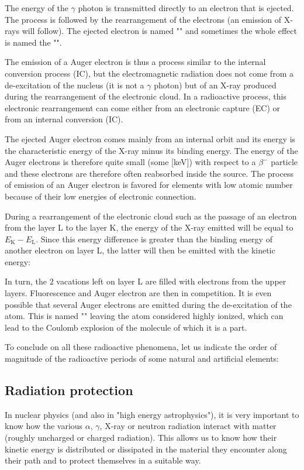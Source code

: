 	The energy of the $\gamma$ photon is transmitted directly to an electron that is ejected. The process is followed by the rearrangement of the electrons (an emission of X-rays will follow). The ejected electron is named "" and sometimes the whole effect is named the "".
	
	The emission of a Auger electron is thus a process similar to the internal conversion process (IC), but the electromagnetic radiation does not come from a de-excitation of the nucleus (it is not a $\gamma$ photon) but of an X-ray produced during the rearrangement of the electronic cloud. In a radioactive process, this electronic rearrangement can come either from an electronic capture (EC) or from an internal conversion (IC).

	The ejected Auger electron comes mainly from an internal orbit and its energy is the characteristic energy of the X-ray minus its binding energy. The energy of the Auger electrons is therefore quite small (some [keV]) with respect to a  $\beta^{-}$ particle and these electrons are therefore often reabsorbed inside the source. The process of emission of an Auger electron is favored for elements with low atomic number because of their low energies of electronic connection.

	During a rearrangement of the electronic cloud such as the passage of an electron from the layer L to the layer K, the energy of the X-ray emitted will be equal to $E_\text{K}-E_\text{L}$. Since this energy difference is greater than the binding energy of another electron on layer L, the latter will then be emitted with the kinetic energy:
	
	In turn, the $2$ vacations left on layer L are filled with electrons from the upper layers. Fluorescence and Auger electron are then in competition. It is even possible that several Auger electrons are emitted during the de-excitation of the atom. This is named "" leaving the atom considered highly ionized, which can lead to the Coulomb explosion of the molecule of which it is a part.
	
	To conclude on all these radioactive phenomena, let us indicate the order of magnitude of the radioactive periods of some natural and artificial elements:
	
	
	\subsection{Radiation protection}
	In nuclear physics (and also in "high energy astrophysics"), it is very important to know how the various $\alpha$, $\gamma$, X-ray or neutron radiation interact with matter (roughly uncharged or charged radiation). This allows us to know how their kinetic energy is distributed or dissipated in the material they encounter along their path and to protect themselves in a suitable way.
	
